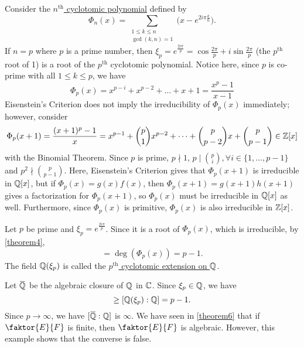 \documentclass[11pt]{article}
\newcommand{\quotient}[2]{\faktor{#1}{#2}}
\begin{document}
\begin{example}
Consider the \underline{$n^{\text{th}}$ cyclotomic polynomial} defined by
\begin{equation*}
\Phi_n(x) = \sum_{\substack{1 \leq k \leq n\\\gcd(k,n) = 1}}
\bigg(x-e^{2i\pi\frac{k}{n}} \bigg).
\end{equation*}
If $n = p$ where $p$ is a prime number, then $\xi_p = e^{\frac{2i\pi}{p}} =
\cos{\frac{2\pi}{p}} + i\sin{\frac{2\pi}{p}}$ (the $p^{\text{th}}$ root of 1)
is a root of the $p^{\text{th}}$ cyclotomic polynomial. Notice here, since $p$
is co-prime with all $1 \leq k \leq p$, we have
\begin{equation*}
\Phi_p(x) = x^{p-i} + x^{p-2} + \dots + x + 1 = \frac{x^p -1}{x-1}
\end{equation*}
Eisenstein's Criterion does not imply the irreducibility of $\Phi_p(x)$
immediately; however, consider
\begin{equation*}
\Phi_p(x+1) = \frac{(x+1)^p -1}{x} = x^{p-1} + \binom{p}{1}x^{p-2} + \dots +
\binom{p}{p-2}x + \binom{p}{p-1}\in \mathbb{Z}[x]
\end{equation*}
with the Binomial Theorem. Since $p$ is prime, $p \nmid 1$, $p \mid
\binom{p}{i}, \forall i \in \{1,\dots,p-1\}$ and $p^2 \nmid \binom{p}{p-1}$.
Here, Eisenstein's Criterion gives that $\Phi_p(x+1)$ is irreducible in
$\mathbb{Q}[x]$, but if $\Phi_p(x) = g(x)f(x)$, then $\Phi_p(x+1) = g(x+1)h(x+1)$ gives
a factorization for $\Phi_p(x+1)$, so $\Phi_p(x)$ must be irreducible in
$\mathbb{Q}[x]$ as well. Furthermore, since $\Phi_p(x)$ is primitive, $\Phi_p(x)$ is
also irreducible in $\mathbb{Z}[x]$.
\end{example}
\begin{example}
Let $p$ be prime and $\xi_p = e^{\frac{2i\pi}{p}}$. Since it is a root of
$\Phi_p(x)$, which is irreducible, by \cref{theorem4},
\begin{equation*}
[\Q(\xi_p):\Q] = \deg(\Phi_p(x)) = p-1.
\end{equation*}
The field $\mathbb{Q}(\xi_p)$ is called the \underline{$p^{\text{th}}$ cyclotomic
extension on $\mathbb{Q}$}.
\end{example}
\begin{example}
Let $\bar\Q$ be the algebraic closure of $\mathbb{Q}$ in $\mathbb{C}$. Since $\xi_p \in \mathbb{Q}$, we
have
\begin{equation*}
[\bar\Q : \Q] \geq [\Q(\xi_p):\Q] = p-1.
\end{equation*}
Since $p \to \infty$, we have $[\bar\Q:\Q]$ is $\infty$. We have seen in
\cref{theorem6} that if $\quotient{E}{F}$ is finite, then $\quotient{E}{F}$ is
algebraic. However, this example shows that the converse is false. 
\end{example}
\end{document}
